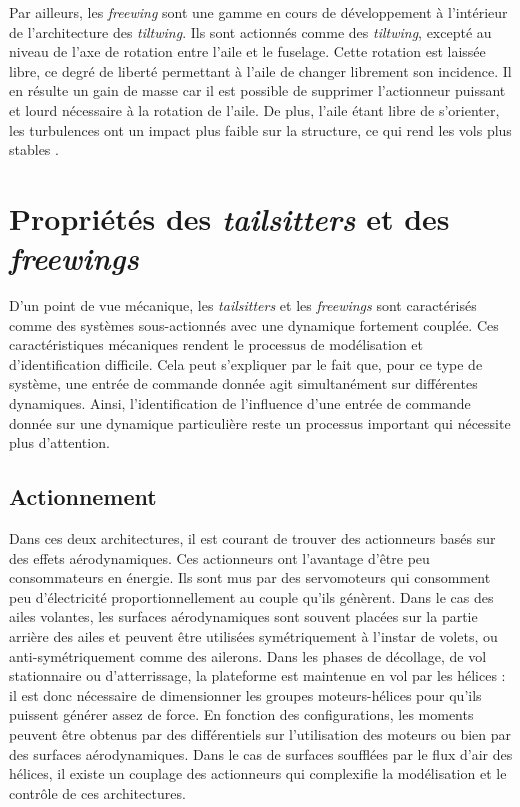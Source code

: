         Par ailleurs, les \textit{freewing} sont une gamme en cours de développement à l'intérieur de l'architecture des \textit{tiltwing}. Ils sont actionnés comme des \textit{tiltwing}, excepté au niveau de l'axe de rotation entre l'aile et le fuselage. Cette rotation est laissée libre, ce degré de liberté permettant à l'aile de changer librement son incidence. Il en résulte un gain de masse car il est possible de supprimer l'actionneur puissant et lourd nécessaire à la rotation de l'aile. De plus, l'aile étant libre de s'orienter, les turbulences ont un impact plus faible sur la structure, ce qui rend les vols plus stables \cite{freewing2012, Johnson2021, Johnson2023}. 


\section{Propriétés des \textit{tailsitters} et des \textit{freewings}}
    D'un point de vue mécanique, les \textit{tailsitters} et les \textit{freewings} sont caractérisés comme des systèmes sous-actionnés avec une dynamique fortement couplée. Ces caractéristiques mécaniques rendent le processus de modélisation et d'identification difficile. Cela peut s'expliquer par le fait que, pour ce type de système, une entrée de commande donnée agit simultanément sur différentes dynamiques. Ainsi, l'identification de l'influence d'une entrée de commande donnée sur une dynamique particulière reste un processus important qui nécessite plus d'attention.
    \subsection{Actionnement}
    Dans ces deux architectures, il est courant de trouver des actionneurs basés sur des effets aérodynamiques. Ces actionneurs ont l'avantage d'être peu consommateurs en énergie. Ils sont mus par des servomoteurs qui consomment peu d'électricité proportionnellement au couple qu'ils génèrent. Dans le cas des ailes volantes, les surfaces aérodynamiques sont souvent placées sur la partie arrière des ailes et peuvent être utilisées symétriquement à l'instar de volets, ou anti-symétriquement comme des ailerons. 
    Dans les phases de décollage, de vol stationnaire ou d'atterrissage, la plateforme est maintenue en vol par les hélices : il est donc nécessaire de dimensionner les groupes moteurs-hélices pour qu'ils puissent générer assez de force. En fonction des configurations, les moments peuvent être obtenus par des différentiels sur l'utilisation des moteurs ou bien par des surfaces aérodynamiques. Dans le cas de surfaces soufflées par le flux d'air des hélices, il existe un couplage des actionneurs qui complexifie la modélisation et le contrôle de ces architectures.

